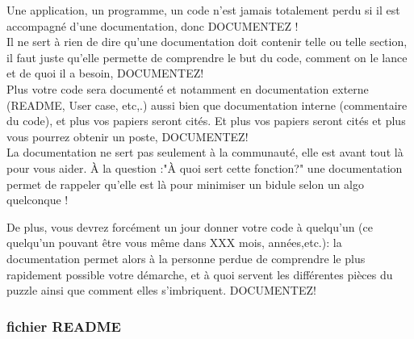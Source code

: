 Une application, un programme, un code n'est jamais totalement perdu si 
il est accompagné d'une documentation, donc DOCUMENTEZ !\\

Il ne sert à rien de dire qu'une documentation doit contenir telle ou telle section, il faut juste 
qu'elle permette de comprendre le but du code, comment on le lance et de quoi il a besoin, DOCUMENTEZ! \\

Plus votre code sera documenté et notamment en documentation externe (README, User case, etc,.) aussi 
bien que documentation interne (commentaire du code), et plus vos papiers seront cités. 
Et plus vos papiers seront cités et plus vous pourrez obtenir un poste, DOCUMENTEZ! \\

La documentation ne sert pas seulement à la communauté, elle est avant tout là pour vous aider. 
\`A la question :"\`A quoi sert cette fonction?" une documentation permet de rappeler qu'elle
 est là pour minimiser un bidule selon un algo quelconque ! 

De plus, vous devrez forcément un jour donner votre code \`a quelqu'un (ce quelqu'un
pouvant \^etre vous m\^eme dans XXX mois, années,etc.):
la documentation permet alors \`a la personne perdue de comprendre le plus rapidement possible 
votre démarche, et à quoi servent les différentes pièces du puzzle ainsi que comment elles 
s'imbriquent. DOCUMENTEZ!

\subsubsection*{fichier README }

